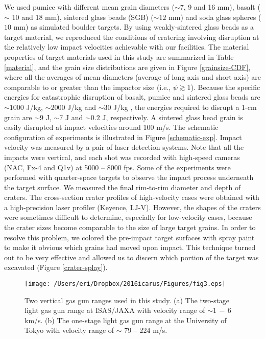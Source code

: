 \documentclass[3p,authoryear]{elsarticle}
\begin{document}
We used pumice with different mean grain diameters ($\sim$7, 9 and 16 mm), basalt ($\sim$ 10 and 18 mm), sintered glass beads (SGB) ($\sim 12$ mm) and soda glass spheres ($10$ mm) as simulated boulder targets.
By using weakly-sintered glass beads \citep[e.g.][]{setoh2010} as a target material, we reproduced the conditions of cratering involving disruption at the relatively low impact velocities achievable with our facilities.
 The material properties of target materials used in this study are summarized in Table \ref{material}, and the grain size distributions are given in Figure \ref{grainsize-CDF}, where all the averages of mean diameters (average of long axis and short axis) are comparable to or greater than the impactor size (i.e., $\psi \gtrsim 1$).
Because the specific energies for catastrophic disruption of basalt, pumice and sintered glass beads are $\sim 1000$ J/kg, $\sim 2000$ J/kg and $\sim 30$ J/kg \citep{takagi1984,HH1999,setoh2010,patmore2014,flynn2015}, the energies required to disrupt a 1-cm grain are $\sim 9$ J, $\sim 7$ J and $\sim 0.2$ J, respectively.
A sintered glass bead grain is easily disrupted at impact velocities around 100 m/s.
The schematic configuration of experiments is illustrated in Figure \ref{schematic-exp}. Impact velocity was measured by a pair of laser detection systems.
 Note that all the impacts were vertical, and each shot was recorded with high-speed cameras (NAC, Fx-4 and Q1v) at 5000 -- 8000 fps.
Some of the experiments were performed with quarter-space targets to observe the impact process underneath the target surface. We measured the final rim-to-rim diameter and depth of craters. The cross-section crater profiles of high-velocity cases were obtained with a high-precision laser profiler (Keyence, LJ-V). However, the shapes of the craters were sometimes difficult to determine, especially for low-velocity cases, because the crater sizes become comparable to the size of large target grains. In order to resolve this problem, we colored the pre-impact target surfaces with spray paint to make it obvious which grains had moved upon impact.
This technique turned out to be very effective and allowed us to discern which portion of the target was excavated (Figure \ref{crater-splay}).
%
\begin{figure*}[tbhp]
	\centering
	\texttt{[image: /Users/eri/Dropbox/2016icarus/Figures/fig3.eps]}
	\caption{Two vertical gas gun ranges used in this study. (a) The two-stage light gas gun range at ISAS/JAXA with velocity range of $\sim 1\,-\,6$ km/s. (b) The one-stage light gas gun range at the University of Tokyo with velocity range of $\sim $ 79 -- 224 m/s.}
	\label{gun_range}
	\centering
\end{figure*}
\end{document}
